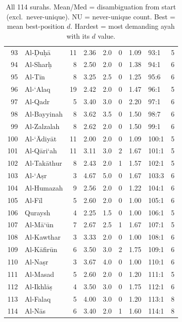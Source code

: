 \documentclass[11pt,a4paper]{article}
\begin{document}
\begin{table}[h]
\begin{minipage}[t]{0.48\textwidth}
\begin{tabular}{rl r r r r r lr}
93 & Al-\d{D}u\d{h}\=a & 11 & 2.36 & 2.0 & 0 & 1.09 & 93:1 & 5 \\
94 & Al-Shar\d{h} & 8 & 2.50 & 2.0 & 0 & 1.38 & 94:1 & 6 \\
95 & Al-T\=in & 8 & 3.25 & 2.5 & 0 & 1.25 & 95:6 & 6 \\
96 & Al-`Alaq & 19 & 2.42 & 2.0 & 0 & 1.47 & 96:1 & 5 \\
97 & Al-Qadr & 5 & 3.40 & 3.0 & 0 & 2.20 & 97:1 & 6 \\
98 & Al-Bayyinah & 8 & 3.62 & 3.5 & 0 & 1.50 & 98:7 & 6 \\
99 & Al-Zalzalah & 8 & 2.62 & 2.0 & 0 & 1.50 & 99:1 & 6 \\
100 & Al-`\=Adiy\=at & 11 & 2.00 & 2.0 & 0 & 1.09 & 100:1 & 5 \\
101 & Al-Q\=ari`ah & 11 & 3.11 & 3.0 & 2 & 1.67 & 101:1 & 5 \\
102 & Al-Tak\=athur & 8 & 2.43 & 2.0 & 1 & 1.57 & 102:1 & 5 \\
103 & Al-`A\d{s}r & 3 & 4.67 & 5.0 & 0 & 1.67 & 103:3 & 6 \\
104 & Al-Humazah & 9 & 2.56 & 2.0 & 0 & 1.22 & 104:1 & 6 \\
105 & Al-F\=il & 5 & 2.60 & 2.0 & 0 & 1.00 & 105:1 & 6 \\
106 & Quraysh & 4 & 2.25 & 1.5 & 0 & 1.00 & 106:1 & 5 \\
107 & Al-M\=a`\=un & 7 & 2.67 & 2.5 & 1 & 1.67 & 107:1 & 5 \\
108 & Al-Kawthar & 3 & 3.33 & 2.0 & 0 & 1.00 & 108:1 & 6 \\
109 & Al-K\=afir\=un & 6 & 3.50 & 3.0 & 2 & 1.75 & 109:1 & 6 \\
110 & Al-Na\d{s}r & 3 & 3.67 & 4.0 & 0 & 1.00 & 110:1 & 6 \\
111 & Al-Masad & 5 & 2.60 & 2.0 & 0 & 1.20 & 111:1 & 5 \\
112 & Al-Ikhl\=a\d{s} & 4 & 3.50 & 3.0 & 0 & 1.75 & 112:1 & 6 \\
113 & Al-Falaq & 5 & 4.00 & 3.0 & 0 & 1.20 & 113:1 & 8 \\
114 & Al-N\=as & 6 & 3.40 & 2.0 & 1 & 1.60 & 114:1 & 8 \\
\bottomrule
\end{tabular}
\end{minipage}
\caption{All 114 surahs. Mean/Med = disambiguation from start (excl.\ never-unique). NU = never-unique count. Best = mean best-position $d$. Hardest = most demanding ayah with its $d$ value.}
\label{tab:all_surahs}
\end{table}
\end{document}
